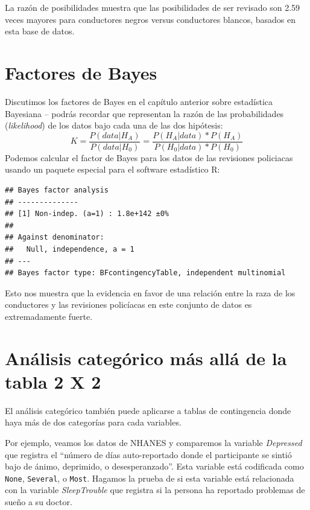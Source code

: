 \documentclass[
  12pt,
]{book}
\begin{document}
La razón de posibilidades muestra que las posibilidades de ser revisado son 2.59 veces mayores para conductores negros versus conductores blancos, basados en esta base de datos.

\hypertarget{factores-de-bayes}{%
\section{Factores de Bayes}\label{factores-de-bayes}}

Discutimos los factores de Bayes en el capítulo anterior sobre estadística Bayesiana -- podrás recordar que representan la razón de las probabilidades (\emph{likelihood}) de los datos bajo cada una de las dos hipótesis:
\[ 
K = \frac{P(data|H_A)}{P(data|H_0)} = \frac{P(H_A|data)*P(H_A)}{P(H_0|data)*P(H_0)}
\]
Podemos calcular el factor de Bayes para los datos de las revisiones policiacas usando un paquete especial para el software estadístico R:

\begin{verbatim}
## Bayes factor analysis
## --------------
## [1] Non-indep. (a=1) : 1.8e+142 ±0%
## 
## Against denominator:
##   Null, independence, a = 1 
## ---
## Bayes factor type: BFcontingencyTable, independent multinomial
\end{verbatim}

Esto nos muestra que la evidencia en favor de una relación entre la raza de los conductores y las revisiones policíacas en este conjunto de datos es extremadamente fuerte.

\hypertarget{anuxe1lisis-categuxf3rico-muxe1s-alluxe1-de-la-tabla-2-x-2}{%
\section{Análisis categórico más allá de la tabla 2 X 2}\label{anuxe1lisis-categuxf3rico-muxe1s-alluxe1-de-la-tabla-2-x-2}}

El análisis categórico también puede aplicarse a tablas de contingencia donde haya más de dos categorías para cada variables.

Por ejemplo, veamos los datos de NHANES y comparemos la variable \emph{Depressed} que registra el ``número de días auto-reportado donde el participante se sintió bajo de ánimo, deprimido, o desesperanzado''. Esta variable está codificada como \texttt{None}, \texttt{Several}, o \texttt{Most}. Hagamos la prueba de si esta variable está relacionada con la variable \emph{SleepTrouble} que registra si la persona ha reportado problemas de sueño a su doctor.
\end{document}
